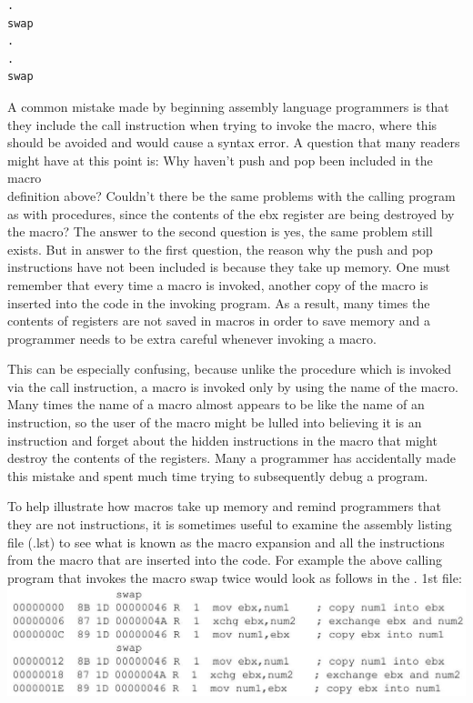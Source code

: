 \documentclass[10pt]{article}
\begin{document}
\begin{verbatim}
.
swap
.
.
swap
\end{verbatim}

A common mistake made by beginning assembly language programmers is that they include the call instruction when trying to invoke the macro, where this should be avoided and would cause a syntax error. A question that many readers might have at this point is: Why haven't push and pop been included in the macro\\
definition above? Couldn't there be the same problems with the calling program as with procedures, since the contents of the ebx register are being destroyed by the macro? The answer to the second question is yes, the same problem still exists. But in answer to the first question, the reason why the push and pop instructions have not been included is because they take up memory. One must remember that every time a macro is invoked, another copy of the macro is inserted into the code in the invoking program. As a result, many times the contents of registers are not saved in macros in order to save memory and a programmer needs to be extra careful whenever invoking a macro.

This can be especially confusing, because unlike the procedure which is invoked via the call instruction, a macro is invoked only by using the name of the macro. Many times the name of a macro almost appears to be like the name of an instruction, so the user of the macro might be lulled into believing it is an instruction and forget about the hidden instructions in the macro that might destroy the contents of the registers. Many a programmer has accidentally made this mistake and spent much time trying to subsequently debug a program.

To help illustrate how macros take up memory and remind programmers that they are not instructions, it is sometimes useful to examine the assembly listing file (.lst) to see what is known as the macro expansion and all the instructions from the macro that are inserted into the code. For example the above calling program that invokes the macro swap twice would look as follows in the . 1st file:\\
\includegraphics[max width=\textwidth, center]{2025_03_24_ebe50cc223a6fbc49eecg-147}
\end{document}
